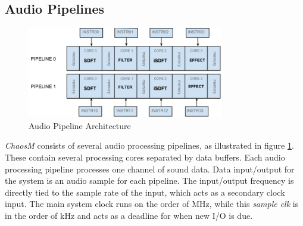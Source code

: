 \FloatBarrier
\subsection{Audio Pipelines}\label{subsec:audio_pipelines}

\begin{figure}[H]
    \centering
    \includegraphics[height=150px]{figures/fpga/system_components_general_pipeline.png}
    \caption{Audio Pipeline Architecture}
    \label{fig:pipeline_architecture}
\end{figure}

\textit{ChaosM} consists of several audio processing pipelines, as illustrated in
figure \ref{fig:pipeline_architecture}. These contain several processing cores
separated by data buffers. Each audio processing pipeline processes one channel
of sound data. Data input/output for the system is an audio sample for each pipeline. 
The input/output frequency is directly tied to the sample rate of the input, which acts as a secondary clock input. The main system clock runs on the order of MHz, while this \textit{sample clk} is in the order of kHz and acts as a deadline for when new I/O is due.